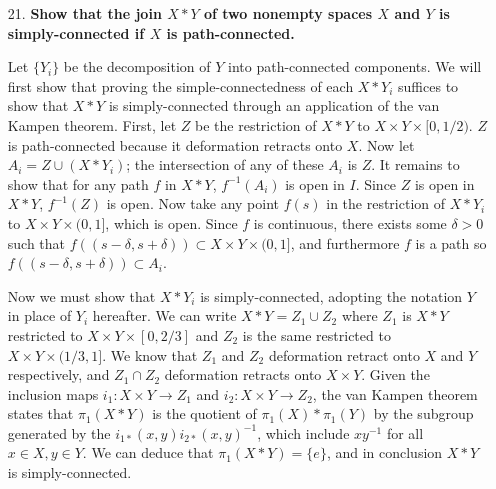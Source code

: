 \documentclass[a4paper,12pt]{article}
\begin{document}
\begin{enumerate}
    \item[21.]
        \boldmath\textbf{Show that the join $X * Y$ of two nonempty spaces $X$ and $Y$ is simply-connected if $X$ is path-connected.
        }\unboldmath \par
        Let $\{Y_i\}$ be the decomposition of $Y$ into path-connected components. We will first show that proving the simple-connectedness of each $X * Y_i$ suffices to show that $X * Y$ is simply-connected through an application of the van Kampen theorem. First, let $Z$ be the restriction of $X * Y$ to $X \times Y \times [0, 1/2)$. $Z$ is path-connected because it deformation retracts onto $X$. Now let $A_i = Z \cup (X * Y_i)$; the intersection of any of these $A_i$ is $Z$. It remains to show that for any path $f$ in $X * Y$, $f^{-1}(A_i)$ is open in $I$. Since $Z$ is open in $X * Y$, $f^{-1}(Z)$ is open. Now take any point $f(s)$ in the restriction of $X * Y_i$ to $X \times Y \times (0, 1]$, which is open. Since $f$ is continuous, there exists some $\delta > 0$ such that $f((s - \delta, s + \delta)) \subset X \times Y \times (0, 1]$, and furthermore $f$ is a path so $f((s - \delta, s + \delta)) \subset A_i$. \par
        Now we must show that $X * Y_i$ is simply-connected, adopting the notation $Y$ in place of $Y_i$ hereafter. We can write $X * Y = Z_1 \cup Z_2$ where $Z_1$ is $X * Y$ restricted to $X \times Y \times [0, 2/3]$ and $Z_2$ is the same restricted to $X \times Y \times (1/3, 1]$. We know that $Z_1$ and $Z_2$ deformation retract onto $X$ and $Y$ respectively, and $Z_1 \cap Z_2$ deformation retracts onto $X \times Y$. Given the inclusion maps $i_1 : X \times Y \to Z_1$ and $i_2 : X \times Y \to Z_2$, the van Kampen theorem states that $\pi_1(X * Y)$ is the quotient of $\pi_1(X) * \pi_1(Y)$ by the subgroup generated by the $i_{1*}(x, y) i_{2*}(x, y)^{-1}$, which include $xy^{-1}$ for all $x \in X, y \in Y$. We can deduce that $\pi_1(X * Y) = \{e\}$, and in conclusion $X * Y$ is simply-connected.


\end{enumerate}
\end{document}
